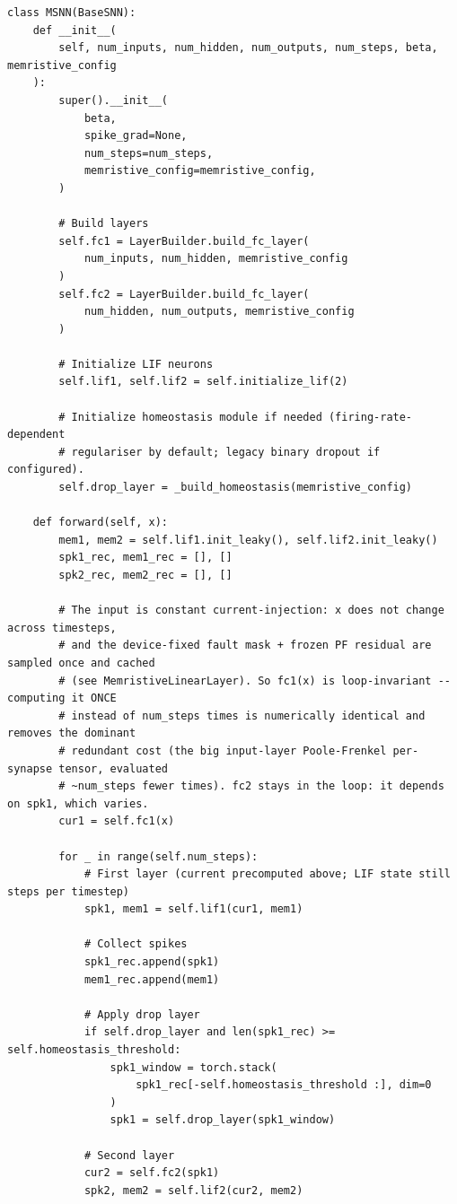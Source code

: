 \begin{lstlisting}[caption={mnn\_torch/models.py},label={lst:mnn-src-models}]
class MSNN(BaseSNN):
    def __init__(
        self, num_inputs, num_hidden, num_outputs, num_steps, beta, memristive_config
    ):
        super().__init__(
            beta,
            spike_grad=None,
            num_steps=num_steps,
            memristive_config=memristive_config,
        )

        # Build layers
        self.fc1 = LayerBuilder.build_fc_layer(
            num_inputs, num_hidden, memristive_config
        )
        self.fc2 = LayerBuilder.build_fc_layer(
            num_hidden, num_outputs, memristive_config
        )

        # Initialize LIF neurons
        self.lif1, self.lif2 = self.initialize_lif(2)

        # Initialize homeostasis module if needed (firing-rate-dependent
        # regulariser by default; legacy binary dropout if configured).
        self.drop_layer = _build_homeostasis(memristive_config)

    def forward(self, x):
        mem1, mem2 = self.lif1.init_leaky(), self.lif2.init_leaky()
        spk1_rec, mem1_rec = [], []
        spk2_rec, mem2_rec = [], []

        # The input is constant current-injection: x does not change across timesteps,
        # and the device-fixed fault mask + frozen PF residual are sampled once and cached
        # (see MemristiveLinearLayer). So fc1(x) is loop-invariant -- computing it ONCE
        # instead of num_steps times is numerically identical and removes the dominant
        # redundant cost (the big input-layer Poole-Frenkel per-synapse tensor, evaluated
        # ~num_steps fewer times). fc2 stays in the loop: it depends on spk1, which varies.
        cur1 = self.fc1(x)

        for _ in range(self.num_steps):
            # First layer (current precomputed above; LIF state still steps per timestep)
            spk1, mem1 = self.lif1(cur1, mem1)

            # Collect spikes
            spk1_rec.append(spk1)
            mem1_rec.append(mem1)

            # Apply drop layer
            if self.drop_layer and len(spk1_rec) >= self.homeostasis_threshold:
                spk1_window = torch.stack(
                    spk1_rec[-self.homeostasis_threshold :], dim=0
                )
                spk1 = self.drop_layer(spk1_window)

            # Second layer
            cur2 = self.fc2(spk1)
            spk2, mem2 = self.lif2(cur2, mem2)


\end{lstlisting}
